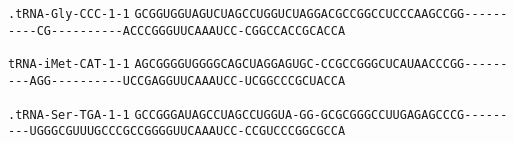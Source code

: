 \documentclass{article}
\newcommand{\rnabox}[1]{\colorbox{#1}{\texttt{#1}}}
\begin{document}
\texttt{.tRNA-Gly-CCC-1-1}
\rnabox{G}\rnabox{C}\rnabox{G}\rnabox{G}\rnabox{U}\rnabox{G}\rnabox{G}\rnabox{U}\rnabox{A}\rnabox{G}\rnabox{U}\rnabox{C}\rnabox{U}\rnabox{A}\rnabox{G}\rnabox{C}\rnabox{C}\rnabox{U}\rnabox{G}\rnabox{G}\rnabox{U}\rnabox{C}\rnabox{U}\rnabox{A}\rnabox{G}\rnabox{G}\rnabox{A}\rnabox{C}\rnabox{G}\rnabox{C}\rnabox{C}\rnabox{G}\rnabox{G}\rnabox{C}\rnabox{C}\rnabox{U}\rnabox{C}\rnabox{C}\rnabox{C}\rnabox{A}\rnabox{A}\rnabox{G}\rnabox{C}\rnabox{C}\rnabox{G}\rnabox{G}\rnabox{-}\rnabox{-}\rnabox{-}\rnabox{-}\rnabox{-}\rnabox{-}\rnabox{-}\rnabox{-}\rnabox{-}\rnabox{-}\rnabox{C}\rnabox{G}\rnabox{-}\rnabox{-}\rnabox{-}\rnabox{-}\rnabox{-}\rnabox{-}\rnabox{-}\rnabox{-}\rnabox{-}\rnabox{-}\rnabox{A}\rnabox{C}\rnabox{C}\rnabox{C}\rnabox{G}\rnabox{G}\rnabox{G}\rnabox{U}\rnabox{U}\rnabox{C}\rnabox{A}\rnabox{A}\rnabox{A}\rnabox{U}\rnabox{C}\rnabox{C}\rnabox{-}\rnabox{C}\rnabox{G}\rnabox{G}\rnabox{C}\rnabox{C}\rnabox{A}\rnabox{C}\rnabox{C}\rnabox{G}\rnabox{C}\rnabox{A}\rnabox{C}\rnabox{C}\rnabox{A}

\vspace{-0.5mm}

\texttt{tRNA-iMet-CAT-1-1}
\rnabox{A}\rnabox{G}\rnabox{C}\rnabox{G}\rnabox{G}\rnabox{G}\rnabox{G}\rnabox{U}\rnabox{G}\rnabox{G}\rnabox{G}\rnabox{G}\rnabox{C}\rnabox{A}\rnabox{G}\rnabox{C}\rnabox{U}\rnabox{A}\rnabox{G}\rnabox{G}\rnabox{A}\rnabox{G}\rnabox{U}\rnabox{G}\rnabox{C}\rnabox{-}\rnabox{C}\rnabox{C}\rnabox{G}\rnabox{C}\rnabox{C}\rnabox{G}\rnabox{G}\rnabox{G}\rnabox{C}\rnabox{U}\rnabox{C}\rnabox{A}\rnabox{U}\rnabox{A}\rnabox{A}\rnabox{C}\rnabox{C}\rnabox{C}\rnabox{G}\rnabox{G}\rnabox{-}\rnabox{-}\rnabox{-}\rnabox{-}\rnabox{-}\rnabox{-}\rnabox{-}\rnabox{-}\rnabox{-}\rnabox{A}\rnabox{G}\rnabox{G}\rnabox{-}\rnabox{-}\rnabox{-}\rnabox{-}\rnabox{-}\rnabox{-}\rnabox{-}\rnabox{-}\rnabox{-}\rnabox{-}\rnabox{U}\rnabox{C}\rnabox{C}\rnabox{G}\rnabox{A}\rnabox{G}\rnabox{G}\rnabox{U}\rnabox{U}\rnabox{C}\rnabox{A}\rnabox{A}\rnabox{A}\rnabox{U}\rnabox{C}\rnabox{C}\rnabox{-}\rnabox{U}\rnabox{C}\rnabox{G}\rnabox{G}\rnabox{C}\rnabox{C}\rnabox{C}\rnabox{G}\rnabox{C}\rnabox{U}\rnabox{A}\rnabox{C}\rnabox{C}\rnabox{A}

\vspace{-0.5mm}

\texttt{.tRNA-Ser-TGA-1-1}
\rnabox{G}\rnabox{C}\rnabox{C}\rnabox{G}\rnabox{G}\rnabox{G}\rnabox{A}\rnabox{U}\rnabox{A}\rnabox{G}\rnabox{C}\rnabox{C}\rnabox{U}\rnabox{A}\rnabox{G}\rnabox{C}\rnabox{C}\rnabox{U}\rnabox{G}\rnabox{G}\rnabox{U}\rnabox{A}\rnabox{-}\rnabox{G}\rnabox{G}\rnabox{-}\rnabox{G}\rnabox{C}\rnabox{G}\rnabox{C}\rnabox{G}\rnabox{G}\rnabox{G}\rnabox{C}\rnabox{C}\rnabox{U}\rnabox{U}\rnabox{G}\rnabox{A}\rnabox{G}\rnabox{A}\rnabox{G}\rnabox{C}\rnabox{C}\rnabox{C}\rnabox{G}\rnabox{-}\rnabox{-}\rnabox{-}\rnabox{-}\rnabox{-}\rnabox{-}\rnabox{-}\rnabox{-}\rnabox{-}\rnabox{U}\rnabox{G}\rnabox{G}\rnabox{G}\rnabox{C}\rnabox{G}\rnabox{U}\rnabox{U}\rnabox{U}\rnabox{G}\rnabox{C}\rnabox{C}\rnabox{C}\rnabox{G}\rnabox{C}\rnabox{C}\rnabox{G}\rnabox{G}\rnabox{G}\rnabox{G}\rnabox{U}\rnabox{U}\rnabox{C}\rnabox{A}\rnabox{A}\rnabox{A}\rnabox{U}\rnabox{C}\rnabox{C}\rnabox{-}\rnabox{C}\rnabox{C}\rnabox{G}\rnabox{U}\rnabox{C}\rnabox{C}\rnabox{C}\rnabox{G}\rnabox{G}\rnabox{C}\rnabox{G}\rnabox{C}\rnabox{C}\rnabox{A}
\end{document}
